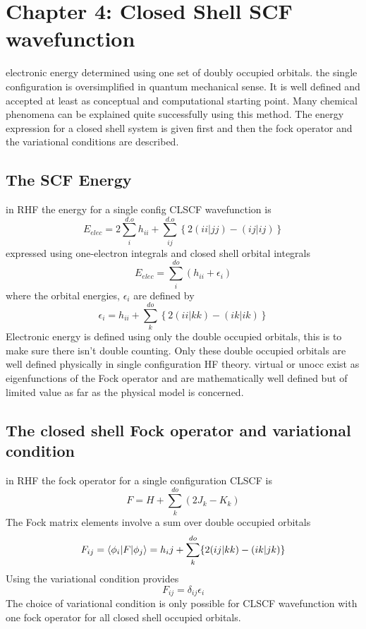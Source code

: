 \section{Chapter 4: Closed Shell SCF wavefunction}
	electronic energy determined using one set of doubly occupied orbitals.  the single configuration is oversimplified in quantum mechanical sense. It is well defined and accepted at least as conceptual and computational starting point.  Many chemical phenomena can be explained quite successfully using this method. The energy expression for a closed shell system is given first and then the fock operator and the variational conditions are described.  
	\subsection{The SCF Energy}
		in RHF the energy for a single config CLSCF wavefunction is 
			\begin{equation} \label{Eelec}
				E_{elec} = 2 \sum_i^{d.o} h_{ii} + \sum_{ij}^{d.o} \left\{2(ii|jj) - (ij|ij)\right\}
			\end{equation}
		expressed using one-electron integrals and closed shell orbital integrals 
			\begin{equation}
				E_{elec} = \sum_i ^{do} (h_{ii} + \epsilon_i)
			\end{equation}
		where the orbital energies, $\epsilon_i$ are defined by 
			\begin{equation}
				\epsilon_i = h_{ii} + \sum_k^{do} \left\{2(ii|kk) - (ik|ik)\right\}
			\end{equation}
		Electronic energy is defined using only the double occupied orbitals, this is to make sure there isn't double counting.  Only these double occupied orbitals are well defined physically in single configuration HF theory.  virtual or unocc exist as eigenfunctions of the Fock operator and are mathematically well defined but of limited value as far as the physical model is concerned.

	\subsection{The closed shell Fock operator and variational condition}
		in RHF the fock operator for a single configuration CLSCF is 
			\begin{equation}
				F = H + \sum_k^{do} \left(2J_k - K_k\right)
			\end{equation}
		The Fock matrix elements involve a sum over double occupied orbitals 
			\begin{equation}\label{Fock}
				F_{ij} = \langle\phi_i | F | \phi_j \rangle = h_ij + \sum_k^{do} \{2(ij|kk) - (ik|jk)\}
			\end{equation}
		Using the variational condition provides
			\begin{equation}
				F_{ij} = \delta_{ij}\epsilon_i
			\end{equation}
		The choice of variational condition is only possible for CLSCF wavefunction with one fock operator for all closed shell occupied orbitals. 

